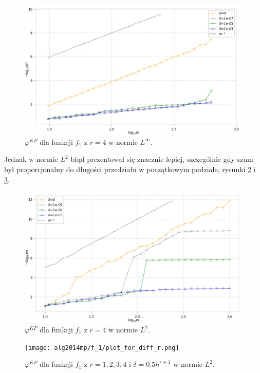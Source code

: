 \documentclass[oik, pdftex, man]{mgrwms}
\begin{document}
    \begin{figure}
        \centering
        \includegraphics[width=.9\linewidth]{alg2014mp/f_1/r_3/p_infinity/plot_30evaluation_0.jpg}
        \caption{$\varphi^{KP}$ dla funkcji $f_{1}$ z $r = 4$ w normie $L^{\infty}$.}
        \label{rys:4:algKP_dla_zaburzonej_p_inf}
    \end{figure}
    Jednak w normie $L^{2}$ błąd prezentował się znacznie lepiej, szczególnie gdy szum był proporcjonalny do długości przedziału w początkowym podziale, rysunki \ref{rys:7:algKP_zaburzona_ale_dla_L2} i \ref{rys:7:different_r}.
    \begin{figure}
        \centering
        \includegraphics[width=.9\linewidth]{alg2014mp/f_1/r_4/p_2/plot_500evaluation_0.jpg}
        \caption{$\varphi^{KP}$ dla funkcji $f_{1}$ z $r = 4$ w normie $L^{2}$.}
        \label{rys:7:algKP_zaburzona_ale_dla_L2}
    \end{figure}
    \begin{figure}
        \centering
        \texttt{[image: alg2014mp/f\_1/plot\_for\_diff\_r.png]}
        \caption{$\varphi^{KP}$ dla funkcji $f_{1}$ z $r = 1,2,3,4$ i $\delta=0.5h^{r+1}$ w normie $L^{2}$.}
        \label{rys:7:different_r}
    \end{figure}
    
\end{document}
